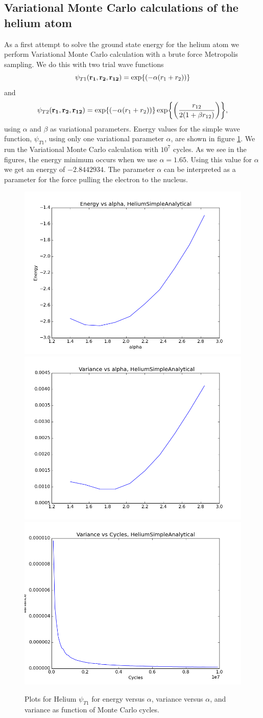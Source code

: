 \subsection{Variational Monte Carlo calculations of the helium atom}
	As a first attempt to solve the ground state energy for the helium
	atom we perform Variational Monte Carlo calculation with a brute force
	Metropolis sampling. We do this with two trial wave functions
	\[
	\psi_{T1}({\bf r_{1}},{\bf r_{2}},{\bf r_{12}})=\exp{\left(-\alpha(r_{1}+r_{2})\right)}
	\]
	and
	\[
	\psi_{T2}({\bf r_{1}},{\bf r_{2}},{\bf r_{12}})=\exp{\left(-\alpha(r_{1}+r_{2})\right)}\exp{\left(\frac{r_{12}}{2(1+\beta r_{12})}\right)},
	\]
	using $\alpha$ and $\beta$ as variational parameters. Energy values
	for the simple wave function, $\psi_{T1}$, using only one variational
	parameter $\alpha$, are shown in figure \ref{fig01:alpha_Simple}.
	We run the Variational Monte Carlo calculation with $10^{7}$ cycles.
	As we see in the figures, the energy minimum occurs when we use $\alpha=1.65$.
	Using this value for $\alpha$ we get an energy of $-2.8442934$.
	The parameter $\alpha$ can be interpreted as a parameter for the
	force pulling the electron to the nucleus.


	\begin{figure}
		\centering \includegraphics[width=0.45\linewidth]{../figures/EnergyVsAlphaHeliumSimpleAnalytical}
		\includegraphics[width=0.45\linewidth]{../figures/VarianceVsAlphaHeliumSimpleAnalytical}
		\includegraphics[width=0.45\linewidth]{../figures/VarianceNCyclesHeliumSimpleAnalytical}\protect\protect\caption{Plots for Helium $\psi_{T1}$ for energy versus $\alpha$, variance versus $\alpha$, and variance as function of Monte Carlo cycles.}
		\label{fig01:alpha_Simple}
	\end{figure}


